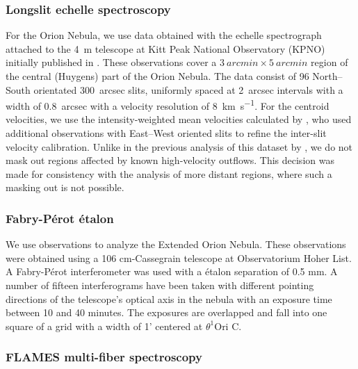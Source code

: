 \documentclass[fleqn,usenatbib, useAMS, a4paper]{mnras}
\begin{document}
\subsubsection{Longslit echelle spectroscopy}
\label{sec:longsl-echelle-spect}

For the Orion Nebula, we use data obtained with the echelle spectrograph attached to the \SI{4}{m} telescope at Kitt Peak National Observatory (KPNO) initially published in
\citet{Doi:2004a}.
These observations cover a \(\SI{3}{arcmin} \times \SI{5}{arcmin}\) region of the
central (Huygens) part of the Orion Nebula.
The data consist of 96 North--South orientated \SI{300}{arcsec} slits,
uniformly spaced at \SI{2}{arcsec} intervals with a width of \SI{0.8}{arcsec}
with a velocity resolution of \SI{8}{km.s^{-1}}. 
For the centroid velocities, we use the intensity-weighted 
mean velocities calculated by \citet{Garcia-Diaz:2008a},
who used additional observations with East--West oriented slits
to refine the inter-slit velocity calibration. 
Unlike in the previous analysis of this dataset by \citet{arthur2016turbulence},
we do not mask out regions affected by known high-velocity outflows.
This decision was made for consistency with the analysis of more distant regions,
where such a masking out is not possible.

\subsubsection{Fabry-Pérot étalon}
\label{sec:fabry-perot-etalaon}

We use \cite{1987A&A...176..347H} observations to analyze the Extended Orion Nebula.
These observations were obtained using a 106 cm-Cassegrain telescope at Observatorium Hoher List. 
A Fabry-Pérot interferometer was used with a étalon separation of 0.5 mm. 
A number of fifteen interferograms have been taken with different pointing directions of the telescope's optical axis in the nebula with an exposure time between 10 and 40 minutes. 
The exposures are overlapped and fall into one square of a grid with a width of 1' centered at \(\theta^{1}\)Ori C.   

\subsubsection{FLAMES multi-fiber spectroscopy}
\label{sec:flames-multi-fiber}
\end{document}

